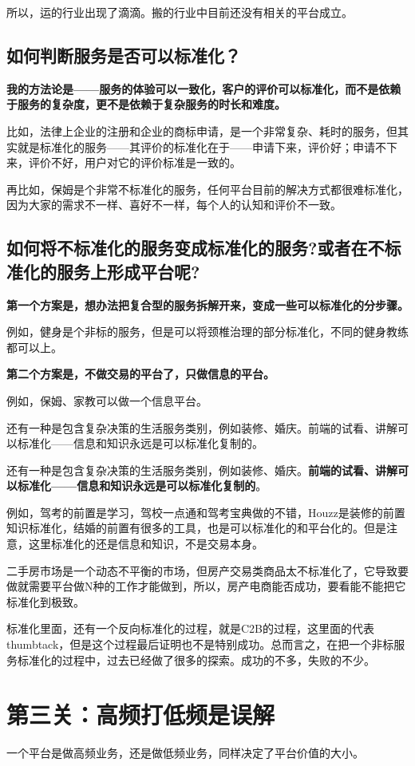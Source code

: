 \documentclass[12pt]{article}
\begin{document}
所以，运的行业出现了滴滴。搬的行业中目前还没有相关的平台成立。

\subsection{如何判断服务是否可以标准化？}

\textbf{我的方法论是——服务的体验可以一致化，客户的评价可以标准化，而不是依赖于服务的复杂度，更不是依赖于复杂服务的时长和难度。}

比如，法律上企业的注册和企业的商标申请，是一个非常复杂、耗时的服务，但其实就是标准化的服务——其评价的标准化在于——申请下来，评价好；申请不下来，评价不好，用户对它的评价标准是一致的。

再比如，保姆是个非常不标准化的服务，任何平台目前的解决方式都很难标准化，因为大家的需求不一样、喜好不一样，每个人的认知和评价不一致。

\subsection{如何将不标准化的服务变成标准化的服务?或者在不标准化的服务上形成平台呢?}
\textbf{第一个方案是，想办法把复合型的服务拆解开来，变成一些可以标准化的分步骤。}

例如，健身是个非标的服务，但是可以将颈椎治理的部分标准化，不同的健身教练都可以上。

\textbf{第二个方案是，不做交易的平台了，只做信息的平台。}

例如，保姆、家教可以做一个信息平台。

还有一种是包含复杂决策的生活服务类别，例如装修、婚庆。前端的试看、讲解可以标准化——信息和知识永远是可以标准化复制的。

还有一种是包含复杂决策的生活服务类别，例如装修、婚庆。\textbf{前端的试看、讲解可以标准化——信息和知识永远是可以标准化复制的}。

例如，驾考的前置是学习，驾校一点通和驾考宝典做的不错，Houzz是装修的前置知识标准化，结婚的前置有很多的工具，也是可以标准化的和平台化的。但是注意，这里标准化的还是信息和知识，不是交易本身。

二手房市场是一个动态不平衡的市场，但房产交易类商品太不标准化了，它导致要做就需要平台做N种的工作才能做到，所以，房产电商能否成功，要看能不能把它标准化到极致。

标准化里面，还有一个反向标准化的过程，就是C2B的过程，这里面的代表thumbtack，但是这个过程最后证明也不是特别成功。总而言之，在把一个非标服务标准化的过程中，过去已经做了很多的探索。成功的不多，失败的不少。

\section{第三关：高频打低频是误解}
一个平台是做高频业务，还是做低频业务，同样决定了平台价值的大小。
\end{document}

